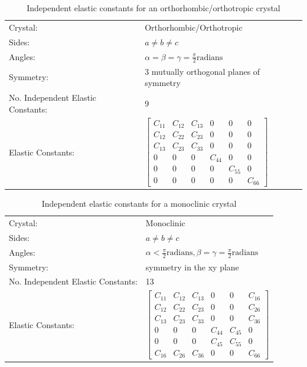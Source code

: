 \renewcommand{\arraystretch}{1.7}
\begin{table}[!htbp]
\begin{tabular}{ll}
Crystal: & Orthorhombic/Orthotropic \\
Sides: & $a \ne b \ne c$ \\
Angles: & $\alpha = \beta = \gamma = \frac{\pi}{2} \text{radians}$ \\
Symmetry: & 3 mutually orthogonal planes of symmetry \\
No. Independent Elastic Constants: & 9  \\
Elastic Constants: & $\begin{bmatrix} C_{11} & C_{12} & C_{13} & 0 & 0 & 0 \\ C_{12} & C_{22} & C_{23} & 0 & 0 & 0 \\ C_{13} & C_{23} & C_{33} & 0 & 0 & 0 \\ 0 & 0 & 0 & C_{44} & 0 & 0 \\ 0 & 0 & 0 & 0 & C_{55} & 0 \\ 0 & 0 & 0 & 0 & 0 & C_{66} \end{bmatrix} $ \\
\end{tabular}
\label{tab:elasticorthorhombic}
\caption{Independent elastic constants for an orthorhombic/orthotropic crystal\cite{typesofelasticstrain}}
\end{table}


\renewcommand{\arraystretch}{1.7}
\begin{table}[!htbp]
\begin{tabular}{ll}
Crystal: & Monoclinic \\
Sides: & $a \ne b \ne c$ \\
Angles: & $\alpha < \frac{\pi}{2} \text{radians},  \beta = \gamma = \frac{\pi}{2} \text{radians}$ \\
Symmetry: & symmetry in the xy plane \\
No. Independent Elastic Constants: & 13  \\
Elastic Constants: & $ \begin{bmatrix} C_{11} & C_{12} & C_{13} & 0 & 0 & C_{16} \\ C_{12} & C_{22} & C_{23} & 0 & 0 & C_{26} \\ C_{13} & C_{23} & C_{33} & 0 & 0 & C_{36} \\ 0 & 0 & 0 & C_{44} & C_{45} & 0 \\ 0 & 0 & 0 & C_{45} & C_{55} & 0 \\ C_{16} & C_{26} & C_{36} & 0 & 0 & C_{66} \end{bmatrix} $ \\
\end{tabular}
\label{tab:elasticmonoclinic}
\caption{Independent elastic constants for a monoclinic crystal\cite{typesofelasticstrain}}
\end{table}


